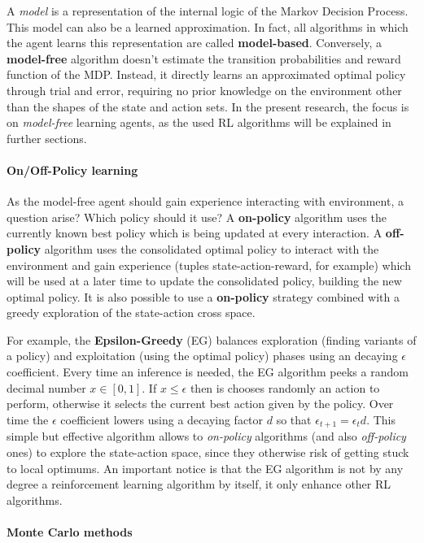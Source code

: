 A \textit{model} is a representation of the internal logic of the Markov Decision Process. This model can also be a learned approximation. In fact, all algorithms in which the agent learns this representation are called \textbf{model-based}. Conversely, a \textbf{model-free} algorithm doesn't estimate the transition probabilities and reward function of the MDP. Instead, it directly learns an approximated optimal policy through trial and error, requiring no prior knowledge on the environment other than the shapes of the state and action sets.
In the present research, the focus is on \textit{model-free} learning agents, as the used RL algorithms will be explained in further sections.

\paragraph{On/Off-Policy learning}

As the model-free agent should gain experience interacting with environment, a question arise? Which policy should it use? A \textbf{on-policy} algorithm uses the currently known best policy which is being updated at every interaction. A \textbf{off-policy} algorithm uses the consolidated optimal policy to interact with the environment and gain experience (tuples state-action-reward, for example) which will be used at a later time to update the consolidated policy, building the new optimal policy. It is also possible to use a \textbf{on-policy} strategy combined with a greedy exploration of the state-action cross space.

For example, the \textbf{Epsilon-Greedy} (EG) balances exploration (finding variants of a policy) and exploitation (using the optimal policy) phases using an decaying $\epsilon$ coefficient.
Every time an inference is needed, the EG algorithm peeks a random decimal number $x \in [0, 1]$. If $x \leq \epsilon$ then is chooses randomly an action to perform, otherwise it selects the current best action given by the policy.
Over time the $\epsilon$ coefficient lowers using a decaying factor $d$ so that $\epsilon_{t + 1} = \epsilon_{t} d$. This simple but effective algorithm allows to \textit{on-policy} algorithms (and also \textit{off-policy} ones) to explore the state-action space, since they otherwise risk of getting stuck to local optimums.
An important notice is that the EG algorithm is not by any degree a reinforcement learning algorithm by itself, it only enhance other RL algorithms.

\paragraph{Monte Carlo methods}

